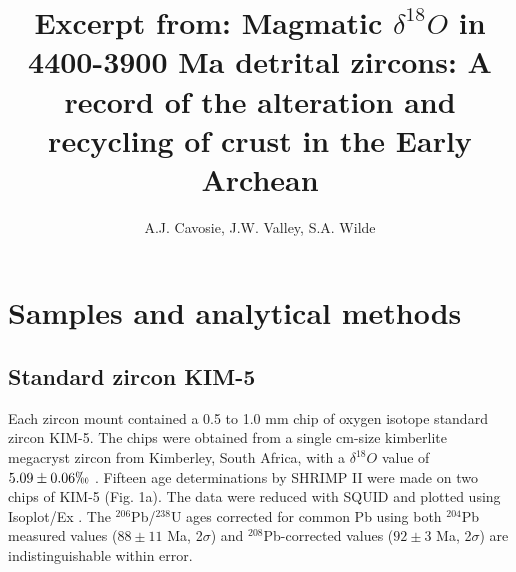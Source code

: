 \documentclass{article}
\begin{document}
\title{\textbf{Excerpt from:} Magmatic $\delta^{18}O$ in 4400-3900 Ma detrital zircons: A record of the alteration and recycling of crust in the Early Archean}
\author{A.J. Cavosie,
			J.W. Valley,
			S.A. Wilde}
\date{}
\maketitle
\setcounter{section}{1} %
\section{Samples and analytical methods}
\setcounter{subsection}{1} %
\subsection{Standard zircon KIM-5}
Each zircon mount contained a 0.5 to 1.0 mm chip of oxygen isotope standard zircon KIM-5. 
The chips were obtained from a single cm-size kimberlite megacryst zircon from Kimberley, South Africa, with a $\delta^{18}O$ value of $5.09\pm0.06\permil$ \citep{valley03, valley01}.
Fifteen age determinations by SHRIMP II were made on two chips of KIM-5 (Fig. 1a).
The data were reduced with SQUID \citep{ludwig01a} and plotted using Isoplot/Ex \citep{ludwig01b}. 
The $^{206}$Pb/$^{238}$U ages corrected for common Pb using both $^{204}$Pb measured values ($88\pm11$ Ma, 2$\sigma$) and  $^{208}$Pb-corrected values ($92\pm3$ Ma, 2$\sigma$) are indistinguishable within error.
\end{document}

